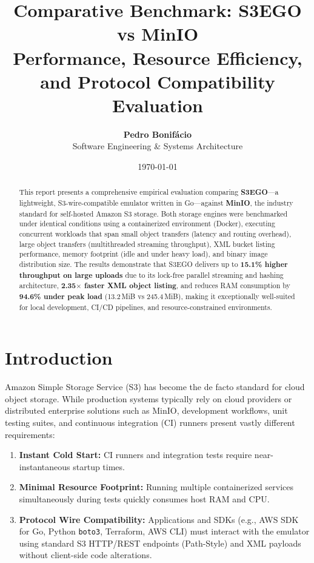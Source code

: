 \documentclass[11pt,a4paper]{article}
\title{\textbf{\LARGE Comparative Benchmark: S3EGO vs MinIO}\\
\large Performance, Resource Efficiency, and Protocol Compatibility Evaluation}
\author{\textbf{Pedro Bonifácio} \\ Software Engineering \& Systems Architecture}
\date{\today}
\begin{document}
\maketitle

\begin{abstract}
This report presents a comprehensive empirical evaluation comparing \textbf{S3EGO}—a lightweight, S3-wire-compatible emulator written in Go—against \textbf{MinIO}, the industry standard for self-hosted Amazon S3 storage. Both storage engines were benchmarked under identical conditions using a containerized environment (Docker), executing concurrent workloads that span small object transfers (latency and routing overhead), large object transfers (multithreaded streaming throughput), XML bucket listing performance, memory footprint (idle and under heavy load), and binary image distribution size. The results demonstrate that S3EGO delivers up to \textbf{15.1\% higher throughput on large uploads} due to its lock-free parallel streaming and hashing architecture, \textbf{2.35$\times$ faster XML object listing}, and reduces RAM consumption by \textbf{94.6\% under peak load} (13.2\,MiB vs 245.4\,MiB), making it exceptionally well-suited for local development, CI/CD pipelines, and resource-constrained environments.
\end{abstract}

\vspace{0.5cm}

\section{Introduction}

Amazon Simple Storage Service (S3) has become the de facto standard for cloud object storage. While production systems typically rely on cloud providers or distributed enterprise solutions such as MinIO, development workflows, unit testing suites, and continuous integration (CI) runners present vastly different requirements:

\begin{enumerate}
    \item \textbf{Instant Cold Start:} CI runners and integration tests require near-instantaneous startup times.
    \item \textbf{Minimal Resource Footprint:} Running multiple containerized services simultaneously during tests quickly consumes host RAM and CPU.
    \item \textbf{Protocol Wire Compatibility:} Applications and SDKs (e.g., AWS SDK for Go, Python \texttt{boto3}, Terraform, AWS CLI) must interact with the emulator using standard S3 HTTP/REST endpoints (Path-Style) and XML payloads without client-side code alterations.
\end{enumerate}
\end{document}
